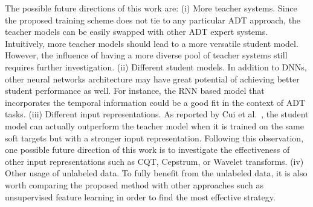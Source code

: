 \documentclass{article}
\begin{document}
The possible future directions of this work are: (i) More teacher systems. Since the proposed training scheme does not tie to any particular ADT approach, the teacher models can be easily swapped with other ADT expert systems. Intuitively, more teacher models should lead to a more versatile student model. However, the influence of having a more diverse pool of teacher systems still requires further investigation. (ii) Different student models. In addition to DNNs, other neural networks architecture may have great potential of achieving better student performance as well. For instance, the RNN based model that incorporates the temporal information could be a good fit in the context of ADT tasks. (iii) Different input representations. As reported by Cui et al.~\cite{Cui2017}, the student model can actually outperform the teacher model when it is trained on the same soft targets but with a stronger input representation. Following this observation, one possible future direction of this work is to investigate the effectiveness of other input representations such as CQT, Cepstrum, or Wavelet transforms. (iv) Other usage of unlabeled data. To fully benefit from the unlabeled data, it is also worth comparing the proposed method with other approaches such as unsupervised feature learning \cite{Raina2007a} in order to find the most effective strategy. 


\end{document}
